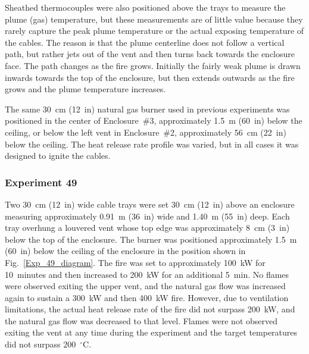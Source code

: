 Sheathed thermocouples were also positioned above the trays to measure the plume (gas) temperature, but these measurements are of little value because they rarely capture the peak plume temperature or the actual exposing temperature of the cables. The reason is that the plume centerline does not follow a vertical path, but rather jets out of the vent and then turns back towards the enclosure face. The path changes as the fire grows. Initially the fairly weak plume is drawn inwards towards the top of the enclosure, but then extends outwards as the fire grows and the plume temperature increases.

The same 30~cm (12~in) natural gas burner used in previous experiments was positioned in the center of Enclosure~\#3, approximately 1.5~m (60~in) below the ceiling, or below the left vent in Enclosure~\#2, approximately 56~cm (22~in) below the ceiling. The heat release rate profile was varied, but in all cases it was designed to ignite the cables.


\clearpage


\subsubsection{Experiment 49}

Two 30~cm (12~in) wide cable trays were set 30~cm (12~in) above an enclosure measuring approximately 0.91~m (36~in) wide and 1.40~m (55~in) deep. Each tray overhung a louvered vent whose top edge was approximately 8~cm (3~in) below the top of the enclosure. The burner was positioned approximately 1.5~m (60~in) below the ceiling of the enclosure in the position shown in Fig.~\ref{Exp_49_diagram}. The fire was set to approximately 100~kW for 10~minutes and then increased to 200~kW for an additional 5~min. No flames were observed exiting the upper vent, and the natural gas flow was increased again to sustain a 300~kW and then 400~kW fire. However, due to ventilation limitations, the actual heat release rate of the fire did not surpass 200~kW, and the natural gas flow was decreased to that level. Flames were not observed exiting the vent at any time during the experiment and the target temperatures did not surpass 200~$^\circ$C.

